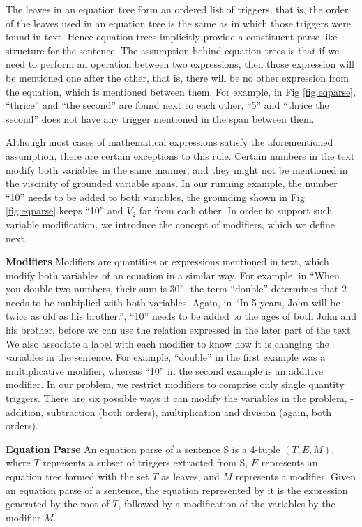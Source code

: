   The leaves in an equation tree form an ordered list of triggers,
  that is, the order of the leaves used in an equation tree is the
  same as in which those triggers were found in text. Hence equation
  trees implicitly provide a constituent parse like structure for the
  sentence. The assumption behind equation trees is that if we need to
  perform an operation between two expressions, then those expression
  will be mentioned one after the other, that is, there will be no
  other expression from the equation, which is mentioned between
  them. For example, in Fig \ref{fig:eqparse}, ``thrice'' and ``the
  second'' are found next to each other, ``5'' and ``thrice the
  second'' does not have any trigger mentioned in the span between
  them. 

  Although most cases of mathematical expressions satisfy the
  aforementioned assumption, there are certain exceptions to this
  rule.  Certain numbers in the text modify both variables in the same
  manner, and they might not be mentioned in the viscinity of grounded
  variable spans. In our running example, the number ``10'' needs to
  be added to both variables, the grounding shown in Fig
  \ref{fig:eqparse} keeps ``10'' and $V_2$ far from each other. In
  order to support such variable modification, we introduce the
  concept of modifiers, which we define next.

  \noindent \textbf{Modifiers} Modifiers are quantities or expressions
  mentioned in text, which modify both variables of an equation in a
  similar way. For example, in ``When you double two numbers, their
  sum is 30'', the term ``double'' determines that $2$ needs to be
  multiplied with both variables. Again, in ``In 5 years, John will be
  twice as old as his brother.'', ``10'' needs to be added to the ages
  of both John and his brother, before we can use the relation
  expressed in the later part of the text. We also associate a label
  with each modifier to know how it is changing the variables in the
  sentence. For example, ``double'' in the first example was a
  multiplicative modifier, whereas ``10'' in the second example is an
  additive modifier. In our problem, we restrict modifiers to comprise
  only single quantity triggers. There are six possible ways it can
  modify the variables in the problem, - addition, subtraction (both
  orders), multiplication and division (again, both orders).

  \noindent \textbf{Equation Parse} An equation parse of a sentence S
  is a 4-tuple $(T, E, M)$, where $T$ represents a subset of triggers
  extracted from S, $E$ represents an equation tree formed with the
  set $T$ as leaves, and $M$ represents a modifier. Given an equation
  parse of a sentence, the equation represented by it is the
  expression generated by the root of $T$, followed by a modification
  of the variables by the modifier $M$.



